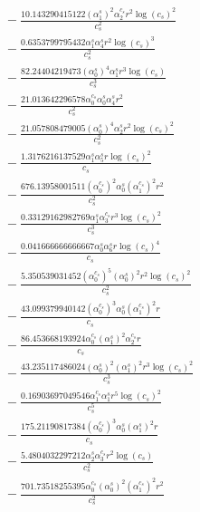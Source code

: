 \documentclass[10pt]{article}
\begin{document}
\begin{align*}
&{}  - \frac{10.143290415122 \left(\alpha_{1}^s\right)^{2} \alpha_{2}^{c_s} r^{2} \log{\left(c_{s} \right)}^{2}}{c_{s}^{2}} \\
&{}  - \frac{0.6353799795432 \alpha_{1}^s \alpha_{4}^s r^{2} \log{\left(c_{s} \right)}^{3}}{c_{s}^{2}} \\
&{}  - \frac{82.24404219473 \left(\alpha_{0}^s\right)^{4} \alpha_{1}^s r^{3} \log{\left(c_{s} \right)}}{c_{s}^{3}} \\
&{}  - \frac{21.013642296578 \alpha_{0}^{c_s} \alpha_{0}^s \alpha_{4}^s r^{2}}{c_{s}^{2}} \\
&{}  - \frac{21.057808479005 \left(\alpha_{0}^s\right)^{4} \alpha_{2}^s r^{2} \log{\left(c_{s} \right)}^{2}}{c_{s}^{2}} \\
&{}  - \frac{1.3176216137529 \alpha_{1}^s \alpha_{5}^s r \log{\left(c_{s} \right)}^{2}}{c_{s}} \\
&{}  - \frac{676.13958001511 \left(\alpha_{0}^{c_s}\right)^{2} \alpha_{0}^s \left(\alpha_{1}^{c_s}\right)^{2} r^{2}}{c_{s}^{2}} \\
&{}  - \frac{0.33129162982769 \alpha_{1}^s \alpha_{3}^{c_s} r^{3} \log{\left(c_{s} \right)}^{2}}{c_{s}^{3}} \\
&{}  - \frac{0.041666666666667 \alpha_{0}^s \alpha_{6}^s r \log{\left(c_{s} \right)}^{4}}{c_{s}} \\
&{}  - \frac{5.350539031452 \left(\alpha_{0}^{c_s}\right)^{5} \left(\alpha_{0}^s\right)^{2} r^{2} \log{\left(c_{s} \right)}^{2}}{c_{s}^{2}} \\
&{}  - \frac{43.099379940142 \left(\alpha_{0}^{c_s}\right)^{3} \alpha_{0}^s \left(\alpha_{1}^{c_s}\right)^{2} r}{c_{s}} \\
&{}  - \frac{86.453668193924 \alpha_{0}^{c_s} \left(\alpha_{1}^s\right)^{2} \alpha_{2}^{c_s} r}{c_{s}} \\
&{}  - \frac{43.235117486024 \left(\alpha_{0}^s\right)^{2} \left(\alpha_{1}^s\right)^{2} r^{3} \log{\left(c_{s} \right)}^{2}}{c_{s}^{3}} \\
&{}  - \frac{0.16903697049546 \alpha_{1}^{c_s} \alpha_{1}^s r^{5} \log{\left(c_{s} \right)}^{2}}{c_{s}^{5}} \\
&{}  - \frac{175.21190817384 \left(\alpha_{0}^{c_s}\right)^{3} \alpha_{0}^s \left(\alpha_{1}^s\right)^{2} r}{c_{s}} \\
&{}  - \frac{5.4804032297212 \alpha_{2}^s \alpha_{3}^{c_s} r^{2} \log{\left(c_{s} \right)}}{c_{s}^{2}} \\
&{}  - \frac{701.73518255395 \alpha_{0}^{c_s} \left(\alpha_{0}^s\right)^{2} \left(\alpha_{1}^{c_s}\right)^{2} r^{2}}{c_{s}^{2}} \\

\end{align*}
\end{document}

